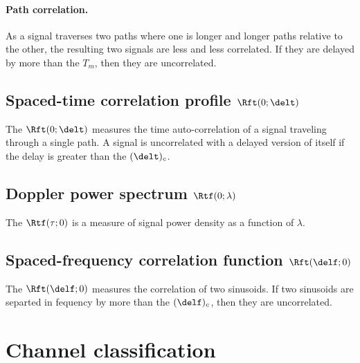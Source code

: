 \paragraph{Path correlation.}
As a signal traverses two paths where one is longer and longer paths relative to the other, 
the resulting two signals are less and less correlated.
If they are delayed by more than the  $T_m$,
then they are uncorrelated.

\subsection*{Spaced-time correlation profile $\Rft(0;\delt)$}
The  $\Rft(0;\delt)$
measures the time auto-correlation of a signal traveling through a 
single path.
A signal is uncorrelated with a delayed version of itself if the delay 
is greater than the  $(\delt)_c$.

\subsection*{Doppler power spectrum $\Rtf(0;\lambda)$}
The  $\Rtf(\tau;0)$ 
is a measure of signal power density as a function of $\lambda$.


\subsection*{Spaced-frequency correlation function $\Rft(\delf;0)$}
The  $\Rft(\delf;0)$
measures the correlation of two sinusoids. 
If two sinusoids are separted in fequency by more than the 
 $(\delf)_c$, then they are uncorrelated.


\section{Channel classification}

